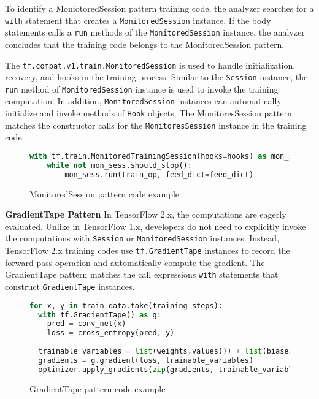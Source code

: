 To identify a MoniotoredSession pattern training code,
the analyzer searches for a {\tt with} statement that creates a
{\tt MonitoredSession} instance.
If the body statements calls a {\tt run} methods of the {\tt MonitoredSession}
instance, the analyzer concludes that the training code belongs to the
MonitoredSession pattern.

The {\tt tf.compat.v1.train.MonitoredSession} is used to handle initialization,
recovery, and hooks in the training process\cite{monitoredsession}.
Similar to the {\tt Session} instance, the {\tt run} method of
{\tt MonitoredSession} instance is used to invoke the training computation.
In addition, {\tt MonitoredSession} instances can automatically
initialize and invoke methods of {\tt Hook} objects.
The MonitoresSession pattern matches the constructor calls for the
{\tt MonitoresSession} instance in the training code.

\begin{figure}[!ht]
  \begin{lstlisting}[language=Python]
with tf.train.MonitoredTrainingSession(hooks=hooks) as mon_sess:
    while not mon_sess.should_stop():
        mon_sess.run(train_op, feed_dict=feed_dict)
  \end{lstlisting}
  \label{fig:monsesspattern}
  \caption{MonitoredSession pattern code example}
\end{figure}


\textbf{GradientTape Pattern}
In TensorFlow 2.x, the computations are eagerly evaluated.
Unlike in TensorFlow 1.x, developers do not need to explicitly invoke the computations
with {\tt Session} or {\tt MonitoredSession} instances.
Instead, TensorFlow 2.x training codes use {\tt tf.GradientTape} instances
to record the forward pass operation and automatically compute the gradient.
The GradientTape pattern matches the call expressions {\tt with} statements
that construct {\tt GradientTape} instances.

\begin{figure}[!ht]
  \begin{lstlisting}[language=Python]
for x, y in train_data.take(training_steps):
  with tf.GradientTape() as g:
    pred = conv_net(x)
    loss = cross_entropy(pred, y)
    
  trainable_variables = list(weights.values()) + list(biases.values())
  gradients = g.gradient(loss, trainable_variables)
  optimizer.apply_gradients(zip(gradients, trainable_variables))
  \end{lstlisting}
  \caption{GradientTape pattern code example}
\end{figure}

